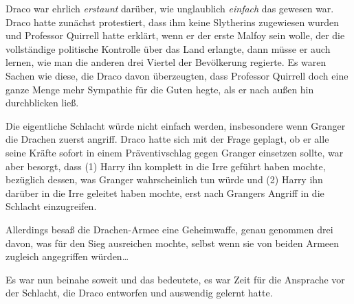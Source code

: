 Draco war ehrlich \emph{erstaunt} darüber, wie unglaublich \emph{einfach} das gewesen war. Draco hatte zunächst protestiert, dass ihm keine Slytherins zugewiesen wurden und Professor Quirrell hatte erklärt, wenn er der erste Malfoy sein wolle, der die vollständige politische Kontrolle über das Land erlangte, dann müsse er auch lernen, wie man die anderen drei Viertel der Bevölkerung regierte. Es waren Sachen wie diese, die Draco davon überzeugten, dass Professor Quirrell doch eine ganze Menge mehr Sympathie für die Guten hegte, als er nach außen hin durchblicken ließ.

Die eigentliche Schlacht würde nicht einfach werden, insbesondere wenn Granger die Drachen zuerst angriff. Draco hatte sich mit der Frage geplagt, ob er alle seine Kräfte sofort in einem Präventivschlag gegen Granger einsetzen sollte, war aber besorgt, dass (1) Harry ihn komplett in die Irre geführt haben mochte, bezüglich dessen, was Granger wahrscheinlich tun würde und (2) Harry ihn darüber in die Irre geleitet haben mochte, erst nach Grangers Angriff in die Schlacht einzugreifen.

Allerdings besaß die Drachen-Armee eine Geheimwaffe, genau genommen drei davon, was für den Sieg ausreichen mochte, selbst wenn sie von beiden Armeen zugleich angegriffen würden…

Es war nun beinahe soweit und das bedeutete, es war Zeit für die Ansprache vor der Schlacht, die Draco entworfen und auswendig gelernt hatte.

